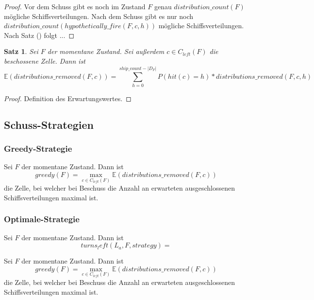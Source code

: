 \documentclass[a4paper,12pt]{llncs}
\numberwithin{equation}{section}
\newtheorem{satz}{Satz}
\begin{document}
\begin{proof}
Vor dem Schuss gibt es noch im Zustand $F$ genau $distribution\_count(F)$ mögliche Schiffsverteilungen.
Nach dem Schuss gibt es nur noch $distribution\_count(hypothetically\_fire(F,c, h))$ mögliche Schiffsverteilungen.
Nach Satz () folgt ...
\end{proof}

\begin{satz}
Sei $F$ der momentane Zustand.
Sei außerdem $c \in C_{left}(F)$ die beschossene Zelle.
Dann ist
\[
\mathds{E}(distributions\_removed(F,c))=\sum_{h=0}^{ship\_count - |D_F|} P(hit(c)=h) * distributions\_removed(F,c,h)
\]
\end{satz}

\begin{proof}
Definition des Erwartungswertes.
\end{proof}

\subsection{Schuss-Strategien}

\subsubsection{Greedy-Strategie}
\begin{definition}
Sei $F$ der momentane Zustand.
Dann ist
\[
greedy(F)=\max_{c \in C_{left}(F)} \mathds{E}(distributions\_removed(F,c))
\]
die Zelle, bei welcher bei Beschuss die Anzahl an erwarteten ausgeschlossenen Schiffsverteilungen maximal ist.
\end{definition}

\subsubsection{Optimale-Strategie}

\begin{definition}
Sei $F$ der momentane Zustand.
Dann ist
\[
turns_left(L_a, F, strategy)=
\]
\end{definition}

\begin{definition}
Sei $F$ der momentane Zustand.
Dann ist
\[
greedy(F)=\max_{c \in C_{left}(F)} \mathds{E}(distributions\_removed(F,c))
\]
die Zelle, bei welcher bei Beschuss die Anzahl an erwarteten ausgeschlossenen Schiffsverteilungen maximal ist.
\end{definition}
\end{document}
